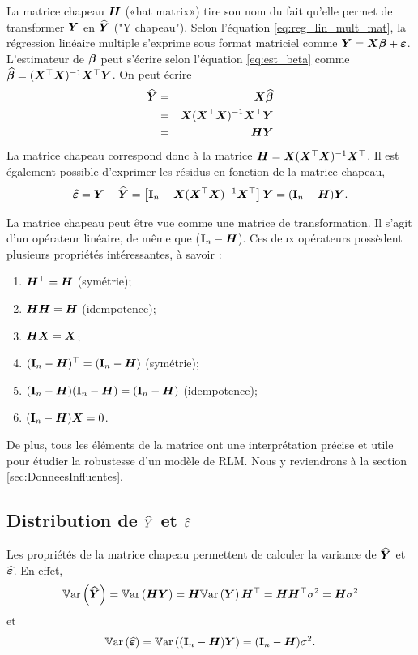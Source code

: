 La matrice chapeau $\bm{H}$ («hat matrix») tire son nom du fait qu'elle permet de transformer $\bm{Y}$ en $\widehat{\bm{Y}}$ ("Y chapeau"). Selon l'équation \eqref{eq:reg_lin_mult_mat}, la régression linéaire multiple s'exprime sous format matriciel comme $\bm{Y} = \bm{X}\bm\beta + \bm\varepsilon$.
L'estimateur de $\bm\beta$ peut s'écrire selon l'équation \eqref{eq:est_beta} comme $\widehat{\bm\beta} = (\bm{X}^\top\bm{X})^{-1}\bm{X}^\top\bm{Y}$. On peut écrire
\begin{eqnarray*}
	\widehat{\bm{Y}}& =& \bm{X}\widehat{\bm\beta} \\
    &= & \bm{X}(\bm{X}^\top\bm{X})^{-1}\bm{X}^\top\bm{Y}\\
    &=& \bm{H}\bm{Y}
\end{eqnarray*}
La matrice chapeau correspond donc à la matrice $\bm{H}=\bm{X}(\bm{X}^\top\bm{X})^{-1}\bm{X}^\top$.
Il est également possible d'exprimer les résidus en fonction de la matrice chapeau,
	\[\widehat{\bm\varepsilon}=\bm{Y}-\widehat{\bm{Y}} = \left[\bold{I}_n- \bm{X}(\bm{X}^\top\bm{X})^{-1}\bm{X}^\top\right]\bm{Y} = (\bold{I}_n-\bm{H})\bm{Y}.
\]

La matrice chapeau peut être vue comme une matrice de transformation. Il s'agit d'un opérateur linéaire, de même que ($\bold{I}_n-\bm{H}$). Ces deux opérateurs possèdent plusieurs propriétés intéressantes, à savoir :

\begin{enumerate}
   \item $\bm{H}^\top=\bm{H}$ (symétrie);
	\item $\bm{H}\bm{H}=\bm{H}$ (idempotence);
	\item $\bm{H}\bm{X}=\bm{X}$;
     \item $(\bold{I}_n-\bm{H})^\top=(\bold{I}_n-\bm{H})$ (symétrie);
	\item $(\bold{I}_n-\bm{H})(\bold{I}_n-\bm{H})=(\bold{I}_n-\bm{H})$ (idempotence);
	\item $(\bold{I}_n-\bm{H})\bm{X}=0$.
\end{enumerate}
De plus, tous les éléments de la matrice ont une interprétation précise et utile pour étudier la robustesse d'un modèle de RLM. Nous y reviendrons à la section \ref{sec:DonneesInfluentes}.


\subsection{Distribution de $\widehat{Y}$ et $\widehat{\varepsilon}$}
\label{sec:distYhatEps}

Les propriétés de la matrice chapeau permettent de calculer la variance de $\widehat{\bm{Y}}$ et $\widehat{\bm\varepsilon}$.
En effet,
\begin{eqnarray*}
	\mathbb{V}\text{ar}\left(\widehat{\bm{Y}}\right) = \mathbb{V}\text{ar}\left(\bm{H}\bm{Y}\right)=\bm{H}\mathbb{V}\text{ar}\left(\bm{Y}\right)\bm{H}^\top= \bm{H}\bm{H}^\top \sigma^2 = \bm{H} \sigma^2
\end{eqnarray*}
et
\begin{eqnarray*}
	\mathbb{V}\text{ar}\left(\widehat{\bm\varepsilon}\right)=\mathbb{V}\text{ar}\left((\bold{I}_n-\bm{H})\bm{Y}\right)= (\bold{I}_n-\bm{H})\sigma^2.
\end{eqnarray*}

